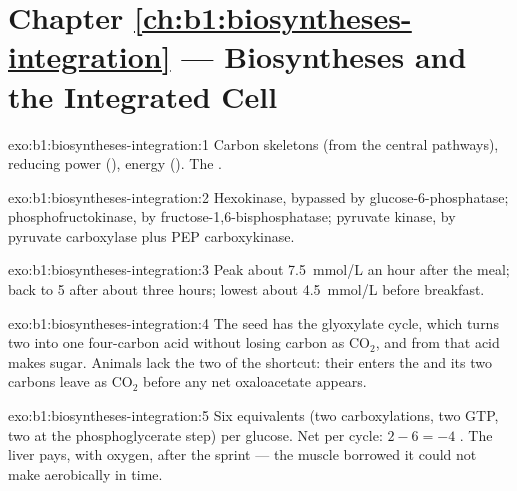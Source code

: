 \section*{Chapter \ref{ch:b1:biosyntheses-integration} --- Biosyntheses and the Integrated Cell}

\begin{solution}{exo:b1:biosyntheses-integration:1}
Carbon skeletons (from the central pathways), reducing power (),
energy (). The .
\end{solution}

\begin{solution}{exo:b1:biosyntheses-integration:2}
Hexokinase, bypassed by glucose-6-phosphatase; phosphofructokinase,
by fructose-1,6-bisphosphatase; pyruvate kinase, by pyruvate
carboxylase plus PEP carboxykinase.
\end{solution}

\begin{solution}{exo:b1:biosyntheses-integration:3}
Peak about \qty{7.5}{mmol/L} an hour after the meal; back to
\qty{5}{} after about three hours; lowest about \qty{4.5}{mmol/L}
before breakfast.
\end{solution}

\begin{solution}{exo:b1:biosyntheses-integration:4}
The seed has the glyoxylate cycle, which turns two  into one
four-carbon acid without losing carbon as $\mathrm{CO_2}$, and from
that acid makes sugar. Animals lack the two  of the shortcut:
their  enters the  and its two carbons leave as
$\mathrm{CO_2}$ before any net oxaloacetate appears.
\end{solution}

\begin{solution}{exo:b1:biosyntheses-integration:5}
Six  equivalents (two carboxylations, two GTP, two  at the
phosphoglycerate step) per glucose. Net per cycle: $2 - 6 = -4$ .
The liver pays, with oxygen, after the sprint --- the muscle borrowed
 it could not make aerobically in time.
\end{solution}

